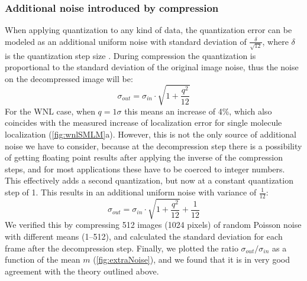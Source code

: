     \subsubsection{Additional noise introduced by compression}
    \label{sec:extraNoise}

    When applying quantization to any kind of data, the quantization error can be modeled as an additional uniform noise with standard deviation of $\frac{\delta}{\sqrt{12}}$, where $\delta$ is the quantization step size \cite{gray_quantization_1998}. During compression the quantization is proportional to the standard deviation of the original image noise, thus the noise on the decompressed image will be:
    \begin{equation}
      \sigma_{out} = \sigma_{in} \cdot \sqrt{1+ \frac{q^2}{12}}
    \end{equation}
    For the WNL case, when $q = 1 \sigma$ this means an increase of 4\%, which also coincides with the measured increase of localization error for single molecule localization (\autoref{fig:wnlSMLM}a). However, this is not the only source of additional noise we have to consider, because at the decompression step there is a possibility of getting floating point results after applying the inverse of the compression steps, and for most applications these have to be coerced to integer numbers. This effectively adds a second quantization, but now at a constant quantization step of 1. This results in an additional uniform noise with variance of $\frac{1}{12}$:
    \begin{equation}
      \sigma_{out} = \sigma_{in} \cdot \sqrt{1+ \frac{q^2}{12}} + \frac{1}{12}
      \label{eq:extraNoise}
    \end{equation}
    We verified this by compressing 512 images (1024 pixels) of random Poisson noise with different means (1--512), and calculated the standard deviation for each frame after the decompression step. Finally, we plotted the ratio $\sigma_{out}/\sigma_{in}$ as a function of the mean $m$ (\autoref{fig:extraNoise}), and we found that it is in very good agreement with the theory outlined above.

    

    

